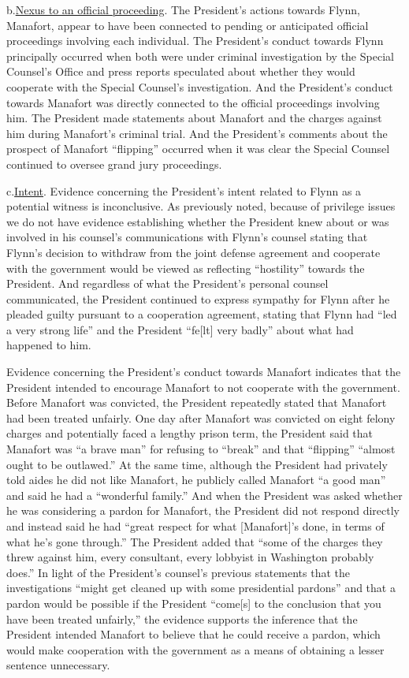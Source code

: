
b.\qquad\underline{Nexus to an official proceeding}.
The President's actions towards Flynn, Manafort,  appear to have been connected to pending or anticipated official proceedings involving each individual.
The President's conduct towards Flynn principally occurred when both were under criminal investigation by the Special Counsel's Office and press reports speculated about whether they would cooperate with the Special Counsel's investigation.
And the President's conduct towards Manafort was directly connected to the official proceedings involving him.
The President made statements about Manafort and the charges against him during Manafort's criminal trial.
And the President's comments about the prospect of Manafort ``flipping'' occurred when it was clear the Special Counsel continued to oversee grand jury proceedings.

c.\qquad\underline{Intent}.
Evidence concerning the President's intent related to Flynn as a potential witness is inconclusive.
As previously noted, because of privilege issues we do not have evidence establishing whether the President knew about or was involved in his counsel's communications with Flynn's counsel stating that Flynn's decision to withdraw from the joint defense agreement and cooperate with the government would be viewed as reflecting ``hostility'' towards the President.
And regardless of what the President's personal counsel communicated, the President continued to express sympathy for Flynn after he pleaded guilty pursuant to a cooperation agreement, stating that Flynn had ``led a very strong life'' and the President ``fe[lt] very badly'' about what had happened to him.

Evidence concerning the President's conduct towards Manafort indicates that the President intended to encourage Manafort to not cooperate with the government.
Before Manafort was convicted, the President repeatedly stated that Manafort had been treated unfairly.
One day after Manafort was convicted on eight felony charges and potentially faced a lengthy prison term, the President said that Manafort was ``a brave man'' for refusing to ``break'' and that ``flipping'' ``almost ought to be outlawed.''
At the same time, although the President had privately told aides he did not like Manafort, he publicly called Manafort ``a good man'' and said he had a ``wonderful family.''
And when the President was asked whether he was considering a pardon for Manafort, the President did not respond directly and instead said he had ``great respect for what [Manafort]'s done, in terms of what he's gone through.''
The President added that ``some of the charges they threw against him, every consultant, every lobbyist in Washington probably does.''
In light of the President's counsel's previous statements that the investigations ``might get cleaned up with some presidential pardons'' and that a pardon would be possible if the President ``come[s] to the conclusion that you have been treated unfairly,'' the evidence supports the inference that the President intended Manafort to believe that he could receive a pardon, which would make cooperation with the government as a means of obtaining a lesser sentence unnecessary.

